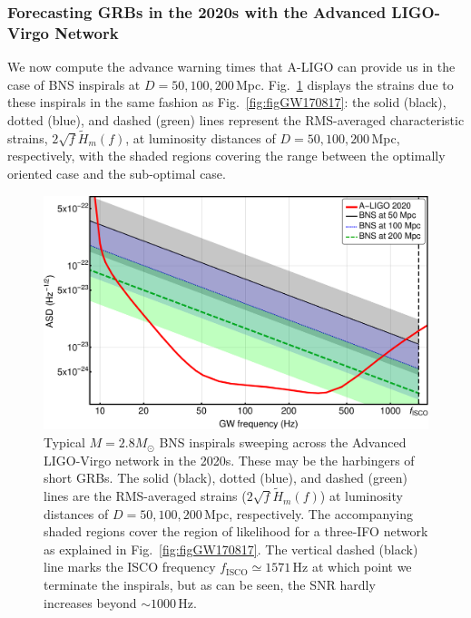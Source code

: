 \documentclass[11pt,a4paper]{article}
\begin{document}
\subsubsection{Forecasting GRBs in the 2020s with the Advanced LIGO-Virgo Network}\label{Sec:ALIGO2020}
We now compute the advance warning times that A-LIGO can provide us in the case of BNS inspirals at $D=50, 100,200\,$Mpc.
Fig.~\ref{fig:LIGO2020} displays the strains due to these inspirals in the same fashion as
Fig.~\ref{fig:figGW170817}: the solid (black), dotted (blue), and dashed (green) lines represent the RMS-averaged characteristic strains, $2\sqrt{f}\tilde{H}_m(f)$, at luminosity distances of $D=50, 100, 200\,$Mpc, respectively, with the shaded regions covering the range
between the optimally oriented case and the sub-optimal case.
%
%
\begin{figure}[h!]
\includegraphics[width=\linewidth]{Figures/ALigo_strains.pdf}
\caption{Typical $M=2.8 M_\odot$ BNS inspirals sweeping across the Advanced LIGO-Virgo network in the 2020s.
These may be the harbingers of short GRBs.
The solid (black), dotted (blue), and dashed (green) lines are the RMS-averaged strains ($2\sqrt{f}\tilde{H}_m(f)$) at luminosity distances of $D=50, 100, 200\,$Mpc, respectively. The accompanying shaded regions cover the region of likelihood for a three-IFO network as explained in Fig.~\ref{fig:figGW170817}.
The vertical dashed (black) line marks the ISCO frequency $f_\text{ISCO} \simeq 1571\,$Hz at which point we terminate the inspirals,
but as can be seen, the SNR hardly increases beyond $\sim 1000\,$Hz.
}
\label{fig:LIGO2020}
\end{figure}
%
%
\end{document}
